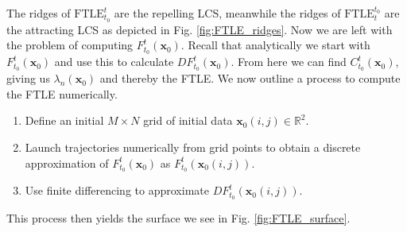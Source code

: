 The ridges of $ \textrm{FTLE} _{t_0}^{t}$ are the repelling LCS, meanwhile the ridges of $ \textrm{FTLE} _{t}^{t_0}$ are the attracting LCS as depicted in Fig. \ref{fig:FTLE_ridges}. Now we are left with the problem of computing $F_{t_0}^{t}( \textbf{x}_0)$. Recall that analytically we start with $F_{t_0}^{t}( \textbf{x}_0)$ and use this to calculate $DF_{t_0}^{t}( \textbf{x}_0)$. From here we can find $C_{t_0}^{t}( \textbf{x}_0)$, giving us $\lambda_n( \textbf{x}_0)$ and thereby the FTLE. We now outline a process to compute the FTLE numerically.
\begin{enumerate}
	\item Define an initial $M\times N$ grid of initial data $ \textbf{x}_0(i,j) \in \mathbb{R}^2$.
	\item Launch trajectories numerically from grid points to obtain a discrete approximation of $F_{t_0}^{t}( \textbf{x}_0)$ as $F_{t_0}^{t}( \textbf{x}_0(i,j))$.
	\item Use finite differencing to approximate $DF_{t_0}^{t}( \textbf{x}_0(i,j)).$
\end{enumerate}
This process then yields the surface we see in Fig. \ref{fig:FTLE_surface}.
